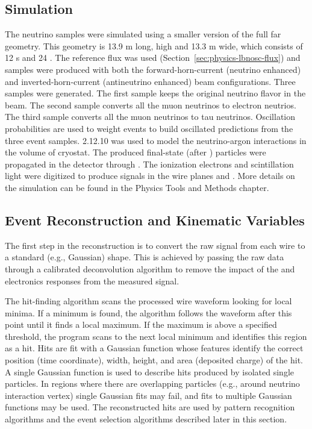 \subsection{Simulation}
The neutrino samples were simulated using a smaller version of the full \nominalmodsize far  geometry. This geometry is 13.9 m long, \tpcheight high and 13.3 m wide, which consists of 12 s and 24 . The reference flux was used (Section~\ref{sec:physics-lbnosc-flux}) and samples were produced with both the forward-horn-current (neutrino enhanced) and inverted-horn-current (antineutrino enhanced) beam configurations. Three samples were generated. The first sample keeps the original neutrino flavor in the beam. The second sample converts all the muon neutrinos to electron neutrios. The third sample converts all the muon neutrinos to tau neutrinos. Oscillation probabilities are used to weight  events to build oscillated  predictions from the three event samples.  2.12.10 was used to model the neutrino-argon interactions in the volume of cryostat. The produced final-state (after ) particles were propagated in the detector through . %
The ionization electrons and scintillation light were digitized to produce signals in the wire planes and . More details on the simulation can be found in the Physics Tools and Methods chapter.

\subsection{Event Reconstruction and Kinematic Variables}
The first step in the reconstruction is to convert the raw signal from each wire to a standard (e.g., Gaussian) shape. This is achieved by passing the raw data through a calibrated deconvolution algorithm to remove the impact of the  \efield and electronics responses from the measured signal.

The hit-finding algorithm scans the processed wire waveform looking for local minima. If a minimum is found, the algorithm follows the waveform after this point until it finds a local maximum. If the maximum is above a specified threshold, the program scans to the next local minimum and identifies this region as a hit. Hits are fit with a Gaussian function whose features identify the correct position (time coordinate), width, height, and area (deposited charge) of the hit. A single Gaussian function is used to describe hits produced by isolated single particles. In regions where there are overlapping particles (e.g., around neutrino interaction vertex) single Gaussian fits may fail, and fits to multiple Gaussian functions may be used. The reconstructed hits are used by pattern recognition algorithms and the  event selection algorithms described later in this section.

